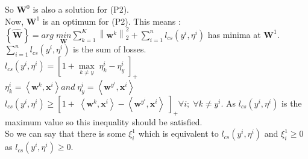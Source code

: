 \documentclass[a4paper,11pt]{article}
\begin{document}
\begin{mlsolution}
So \begin{math}\textbf{W}^{0}\end{math} is also a solution for (P2).\\

Now, \begin{math}\textbf{W}^{1}\end{math} is an optimum for (P2). This means :\\

\begin{math}\left \{ \widehat{\textbf{W}} \right \} = \underset{\textbf{}}{arg} \; \underset{  \textbf{W}}{min} \sum_{k=1}^{K} \left \| \textbf{w}^{k} \right \|^{2}_{2} + \sum_{i=1}^{n} l _{cs}\left ( y^{i}, \eta ^{i} \right )\end{math} has minima at \begin{math}\textbf{W}^{1}\end{math}.\\

\begin{math}
\sum_{i=1}^{n} l_{cs} (y^{i}, \eta^{i}) 
\end{math} is the sum of losses.\\

\begin{math}l_{cs}(y^{i}, \eta^{i}) =   \left [  1 + \underset{k\neq y}{\max} \;\eta_{k}^{i} - \eta_{y} ^{i}\;\right ]_{+}\end{math}\\

\begin{math}
\eta_{k} ^{i} = \left \langle \textbf{w}^{k}, \textbf{x}^{i} \right \rangle  and \;\eta_{y} ^{i} = \left \langle \textbf{w}^{y^{i}}, \textbf{x}^{i} \right \rangle
\end{math}\\

\begin{math}l_{cs}(y^{i}, \eta^{i}) \geq \left [  1 +  \;\left \langle \textbf{w}^{k}, \textbf{x}^{i} \right \rangle - \left \langle \textbf{w}^{y^{i}}, \textbf{x}^{i} \right \rangle\;\right ]_{+}\forall i; \;\forall k \neq y^{i}\end{math}. 
As \begin{math}l_{cs}(y^{i}, \eta^{i})\end{math} is the maximum value so this inequality should be satisfied. \\


So we can say that there is some \begin{math}
\xi_{i}^{1}\end{math} which is equivalent to \begin{math}l_{cs}(y^{i}, \eta^{i})\end{math} and \begin{math} \xi_{i}^{1} \geq 0 \end{math} as \begin{math}l_{cs}(y^{i}, \eta^{i}) \geq 0 \end{math}.\\


\end{mlsolution}
\end{document}

